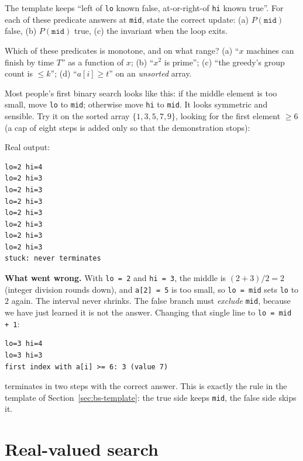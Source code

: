 \begin{exercise}[easy]\label{exr:boundary}
The template keeps ``left of \texttt{lo} known false, at-or-right-of
\texttt{hi} known true''. For each of these predicate answers at
\texttt{mid}, state the correct update: (a) $P(\texttt{mid})$ false,
(b) $P(\texttt{mid})$ true, (c) the invariant when the loop exits.
\end{exercise}

\begin{exercise}[medium]\label{exr:monotone}
Which of these predicates is monotone, and on what range?
(a) ``$x$ machines can finish by time $T$'' as a function of $x$;
(b) ``$x^2$ is prime''; (c) ``the greedy's group count is $\le k$'';
(d) ``$a[i] \ge t$'' on an \emph{unsorted} array.
\end{exercise}

\begin{example}\label{ex:bs-naive}
Most people's first binary search looks like this: if the middle element is too
small, move \texttt{lo} to \texttt{mid}; otherwise move \texttt{hi} to \texttt{mid}.
It looks symmetric and sensible. Try it on the sorted array $\{1,3,5,7,9\}$,
looking for the first element $\ge 6$ (a cap of eight steps is added only so that
the demonstration stops):

Real output:
\begin{lstlisting}[numbers=none]
lo=2 hi=4
lo=2 hi=3
lo=2 hi=3
lo=2 hi=3
lo=2 hi=3
lo=2 hi=3
lo=2 hi=3
lo=2 hi=3
stuck: never terminates
\end{lstlisting}
\textbf{What went wrong.} With \texttt{lo = 2} and \texttt{hi = 3}, the middle is
$(2+3)/2=2$ (integer division rounds down), and \texttt{a[2] = 5} is too small,
so \texttt{lo = mid} sets \texttt{lo} to $2$ again. The interval never shrinks.
The false branch must \emph{exclude} \texttt{mid}, because we have just learned it
is not the answer. Changing that single line to \texttt{lo = mid + 1}:
\begin{lstlisting}[numbers=none]
lo=3 hi=4
lo=3 hi=3
first index with a[i] >= 6: 3 (value 7)
\end{lstlisting}
terminates in two steps with the correct answer. This is exactly the rule in the
template of Section~\ref{sec:bs-template}: the true side keeps \texttt{mid}, the
false side skips it.
\end{example}

\section{Real-valued search}\label{sec:bs-real}

